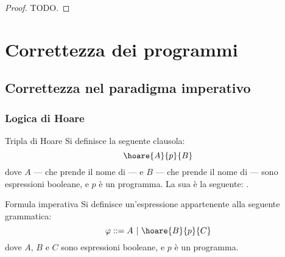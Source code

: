 \documentclass[a4paper, 12pt]{report}
\begin{document}
    \begin{proof}
        TODO.
    \end{proof}

    \chapter{Correttezza dei programmi}
    
    \section{Correttezza nel paradigma imperativo}

    \subsection{Logica di Hoare}

    \begin{frameddefn}{Tripla di Hoare}
        Si definisce  la seguente clausola: $$\hoare{A}{p}{B}$$ dove $A$ --- che prende il nome di  --- e $B$ --- che prende il nome di  --- sono espressioni booleane, e $p$ è un programma. La sua  è la seguente: .
    \end{frameddefn}

    \begin{frameddefn}[label={imp formula}]{Formula imperativa}
        Si definisce  un'espressione appartenente alla seguente grammatica: $$\varphi ::= A \ | \ \hoare{B}{p}{C}$$ dove $A$, $B$ e $C$ sono espressioni booleane, e $p$ è un programma.
    \end{frameddefn}
\end{document}
